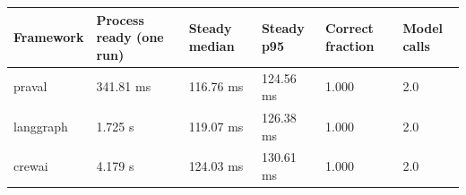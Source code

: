 \begin{tabular}{llllll}
\hline
Framework & Process ready (one run) & Steady median & Steady p95 & Correct fraction & Model calls \\
\hline
praval & 341.81 ms & 116.76 ms & 124.56 ms & 1.000 & 2.0 \\
langgraph & 1.725 s & 119.07 ms & 126.38 ms & 1.000 & 2.0 \\
crewai & 4.179 s & 124.03 ms & 130.61 ms & 1.000 & 2.0 \\
\hline
\end{tabular}
